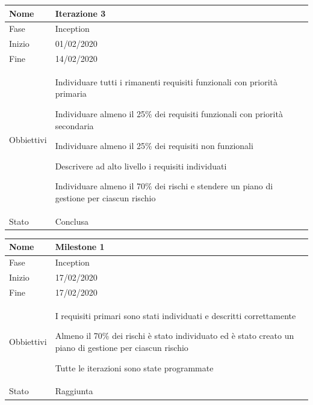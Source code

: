 \begin{center}
\begin{tabular}{ |p{2cm}|p{10cm}|  }
\hline
Nome & Iterazione 3 \\\hline
Fase & Inception \\\hline
Inizio & 01/02/2020 \\\hline
Fine &  14/02/2020 \\\hline
Obbiettivi & 
	\begin{compactitem}
		
		\item Individuare tutti i rimanenti requisiti funzionali con priorità primaria
		\item Individuare almeno il 25\% dei requisiti funzionali con priorità secondaria
		\item Individuare almeno il 25\% dei requisiti non funzionali
		\item Descrivere ad alto livello i requisiti individuati
		\item Individuare almeno il 70\% dei rischi e stendere un piano di gestione per ciascun rischio
	\end{compactitem}\\\hline
Stato &  Conclusa \\\hline %
\end{tabular}
\label{table:3}\newline

\begin{tabular}{ |p{2cm}|p{10cm}|  }
\hline
Nome & Milestone 1\\\hline
Fase & Inception \\\hline
Inizio & 17/02/2020 \\\hline
Fine &  17/02/2020 \\\hline
Obbiettivi & 
	\begin{compactitem}
		\item I requisiti primari sono stati individuati e descritti correttamente
		\item Almeno il 70\% dei rischi è stato individuato ed è stato creato un piano di gestione per ciascun rischio
		\item Tutte le iterazioni sono state programmate
	\end{compactitem}\\\hline
Stato &  Raggiunta \\\hline
\end{tabular}
\label{table:milestone1}\newline


\end{center}
